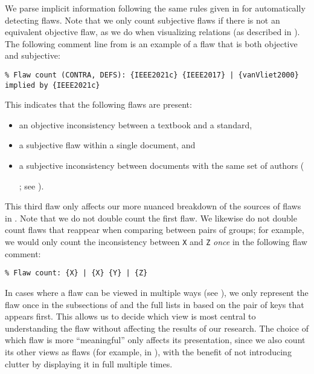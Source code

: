 We parse implicit information following
the same rules given in  for
automatically detecting flaws. Note that we only count subjective flaws if there
is not an equivalent objective flaw, as we do when visualizing relations
(as described in ). The following comment line\utd{} from
 is an example of a flaw that is both objective and subjective:
\begin{displayquote}
    \texttt{\% Flaw count (CONTRA, DEFS): \{IEEE2021c\} \{IEEE2017\} |
        \displayNL \{vanVliet2000\} implied by \{IEEE2021c\}}
\end{displayquote}
This indicates that the following flaws are present:
\begin{itemize}
    \item an objective inconsistency between a textbook and a standard,
    \item a subjective flaw within a single document, and
    \item a subjective inconsistency between documents with the same set of
          authors (\begin{NoHyper}\citeauthor{IEEE2022}\end{NoHyper}; see
          ).
\end{itemize}
This third flaw only affects our more nuanced breakdown of the sources of flaws
in . %
Note that we do not double count the first flaw. We likewise do not double
count flaws that reappear when comparing between pairs of groups; for example,
we would only count the inconsistency between \texttt{X} and \texttt{Z}
\emph{once} in the following flaw comment:
\begin{displayquote}
    \texttt{\% Flaw count: \{X\} | \{X\} \{Y\} | \{Z\}}
\end{displayquote}

In cases where a flaw can be viewed in multiple ways (see ),
we only represent the flaw once in the subsections of  and
the full lists in  based on the pair of keys that appears
first. This allows us to decide which view is most central to understanding the
flaw without affecting the results of our research. The choice of which flaw is
more ``meaningful'' only affects its presentation, since we also count its other
views as flaws (for example, in ), with the
benefit of not introducing clutter by displaying it in full multiple times.

